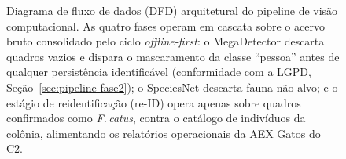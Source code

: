\begin{figure}[!htbp]
\begin{tikzpicture}
  \end{tikzpicture}
  \caption[Diagrama de fluxo de dados do pipeline de visão computacional]{Diagrama de fluxo de dados (DFD) arquitetural do pipeline de visão computacional. As quatro fases operam em cascata sobre o acervo bruto consolidado pelo ciclo \textit{offline-first}: o MegaDetector descarta quadros vazios e dispara o mascaramento da classe ``pessoa'' antes de qualquer persistência identificável (conformidade com a LGPD, Seção~\ref{sec:pipeline-fase2}); o SpeciesNet descarta fauna não-alvo; e o estágio de reidentificação (re-ID) opera apenas sobre quadros confirmados como \textit{F.\,catus}, contra o catálogo de indivíduos da colônia, alimentando os relatórios operacionais da AEX Gatos do C2.}
  \label{fig:dfd-pipeline}
\end{figure}